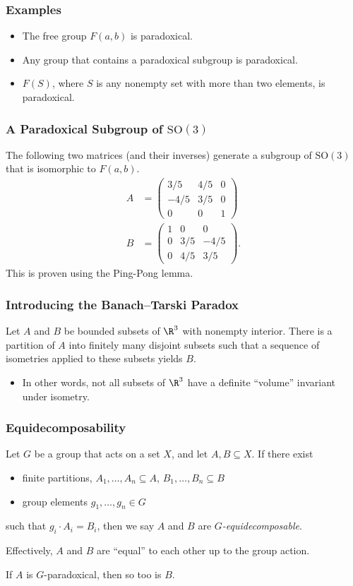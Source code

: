 \documentclass{beamer-custom}
\begin{document}
\begin{frame}
  \frametitle{Examples}
  \begin{itemize}
    \item The free group $F(a,b)$ is paradoxical.\pause
    \item Any group that contains a paradoxical subgroup is paradoxical.
    \item $F(S)$, where $S$ is any nonempty set with more than two elements, is paradoxical.
  \end{itemize}
\end{frame}
\begin{frame}
  \frametitle{A Paradoxical Subgroup of $\text{SO}(3)$}
  The following two matrices (and their inverses) generate a subgroup of $\text{SO}(3)$ that is isomorphic to $F(a,b)$.
  \begin{align*}
    A &= \begin{pmatrix}3/5 & 4/5 & 0 \\  -4/5 & 3/5 & 0 \\ 0 & 0 & 1\end{pmatrix}\\
    B &= \begin{pmatrix}1 & 0 & 0 \\ 0 & 3/5 & -4/5 \\ 0 & 4/5 & 3/5\end{pmatrix}.
  \end{align*}\pause
  This is proven using the Ping-Pong lemma.
\end{frame}
\begin{frame}
  \frametitle{Introducing the Banach--Tarski Paradox}
  \begin{theorem}
    Let $A$ and $B$ be bounded subsets of $\R^3$ with nonempty interior. There is a partition of $A$ into finitely many disjoint subsets such that a sequence of isometries applied to these subsets yields $B$.
  \end{theorem}\pause
  \begin{itemize}
    \item In other words, not all subsets of $\R^3$ have a definite ``volume'' invariant under isometry.
  \end{itemize}
\end{frame}
\begin{frame}
  \frametitle{Equidecomposability}
  Let $G$ be a group that acts on a set $X$, and let $A,B\subseteq X$. If there exist
  \begin{itemize}
    \item finite partitions, $A_1,\dots,A_n\subseteq A$, $B_1,\dots,B_n\subseteq B$
    \item group elements $g_1,\dots,g_n\in G$
  \end{itemize}
  such that $g_i\cdot A_i = B_i$, then we say $A$ and $B$ are \textit{$G$-equidecomposable}.\pause\newline

  Effectively, $A$ and $B$ are ``equal'' to each other up to the group action.\pause\newline

  If $A$ is $G$-paradoxical, then so too is $B$.
\end{frame}
\end{document}
